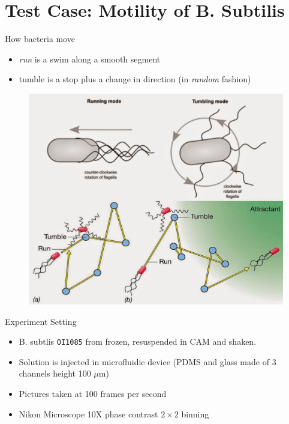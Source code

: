 \documentclass{beamer}
\begin{document}
			
			
			
	

	



\section{Test Case: Motility of B. Subtilis}

	\begin{frame}{}
		\begin{block}{How bacteria move}
			
			\begin{itemize}
				\item \textit{run} is a swim along a smooth segment
				\item tumble is a stop plus a change in direction (in \textit{random} fashion) 
			\end{itemize}
		\end{block}
		
		\begin{figure}
					\centering
					\includegraphics[scale=0.10]{./images/run}
				\end{figure}

	\end{frame}
	\begin{frame}{Experiment Setting}
\begin{itemize}
\item B. subtlis \texttt{OI1085} from frozen, resuspended in CAM and shaken.
\item Solution is injected in microfluidic device (PDMS and glass made of 3 channels height 100 $\mu$m)
\item Pictures taken at 100 frames per second
\item Nikon Microscope 10X phase contrast  $2 \times 2$ binning
\end{itemize}
	\end{frame}
	
\end{document}
